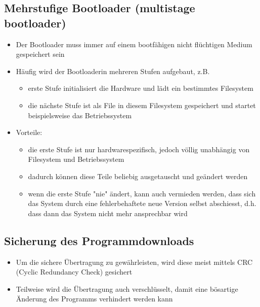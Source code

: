 \subsection{Mehrstufige Bootloader (multistage bootloader)}
\begin{itemize}
	\item Der Bootloader muss immer auf einem bootfähigen nicht flüchtigen Medium gespeichert sein
	\item Häufig wird der Bootloaderin mehreren Stufen aufgebaut, z.B. 
	\begin{itemize}
		\item erste Stufe initialisiert die Hardware und lädt ein bestimmtes Filesystem 
		\item die nächste Stufe ist als File in diesem Filesystem gespeichert und startet beispielsweise das Betriebssystem 
	\end{itemize}
	\item Vorteile: 
	\begin{itemize}
		\item die erste Stufe ist nur hardwarespezifisch, jedoch völlig unabhängig von Filesystem und Betriebssystem 
		\item  dadurch können diese Teile beliebig ausgetauscht und geändert werden 
		\item wenn die erste Stufe "nie" ändert, kann auch vermieden werden, dass sich das System durch eine fehlerbehaftete neue Version selbst abschiesst, d.h. dass dann das System nicht mehr ansprechbar wird
	\end{itemize}
\end{itemize}

\subsection{Sicherung des Programmdownloads}
\begin{itemize}
	\item Um die sichere Übertragung zu gewährleisten, wird diese meist mittels CRC (Cyclic Redundancy Check) gesichert
	\item Teilweise wird die Übertragung auch verschlüsselt, damit eine bösartige Änderung des Programms verhindert werden kann	
\end{itemize}

